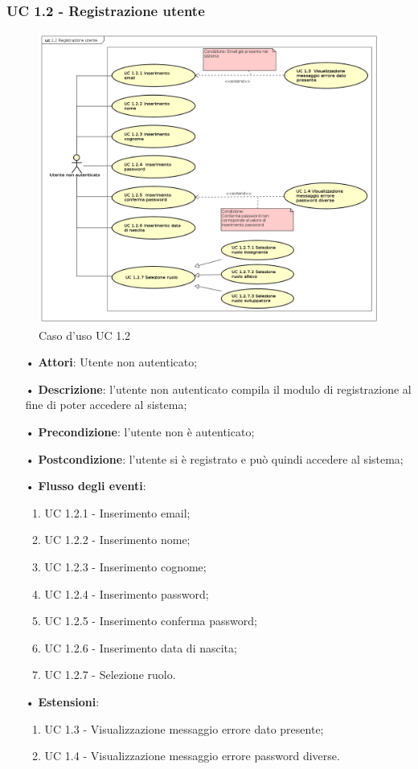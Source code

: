 \subsubsection{UC 1.2 - Registrazione utente}
\begin{figure}[H]
	\centering
	\includegraphics[width=17cm]{img/UC12.png} 
	\caption{Caso d'uso UC 1.2}\label{fig:12}
\end{figure}
\begin{itemize}
	\item[•]\textbf{Attori}: Utente non autenticato;
	\item[•]\textbf{Descrizione}: l'utente non autenticato compila il modulo di registrazione al fine di poter accedere al sistema;
	\item[•]\textbf{Precondizione}: l'utente non è autenticato;
	\item[•]\textbf{Postcondizione}: l'utente si è registrato e può quindi accedere al sistema;
	\item[•]\textbf{Flusso degli eventi}:
	\begin{enumerate}
		\item UC 1.2.1 - Inserimento email;
		\item UC 1.2.2 - Inserimento nome;
		\item UC 1.2.3 - Inserimento cognome;
		\item UC 1.2.4 - Inserimento password;
		\item UC 1.2.5 - Inserimento conferma password;
		\item UC 1.2.6 - Inserimento data di nascita;
		\item UC 1.2.7 - Selezione ruolo.
	\end{enumerate}
	\item[•]\textbf{Estensioni}:
	\begin{enumerate}
		\item UC 1.3 - Visualizzazione messaggio errore dato presente;
		\item UC 1.4 - Visualizzazione messaggio errore password diverse.
	\end{enumerate}
\end{itemize}

